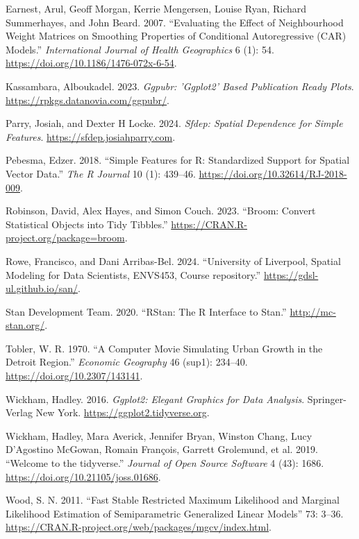 \begin{CSLReferences}{1}{0}
\leavevmode{}%
Earnest, Arul, Geoff Morgan, Kerrie Mengersen, Louise Ryan, Richard Summerhayes, and John Beard. 2007. {``Evaluating the Effect of Neighbourhood Weight Matrices on Smoothing Properties of Conditional Autoregressive (CAR) Models.''} \emph{International Journal of Health Geographics} 6 (1): 54. \url{https://doi.org/10.1186/1476-072x-6-54}.

\leavevmode{}%
Kassambara, Alboukadel. 2023. \emph{Ggpubr: 'Ggplot2' Based Publication Ready Plots}. \url{https://rpkgs.datanovia.com/ggpubr/}.

\leavevmode{}%
Parry, Josiah, and Dexter H Locke. 2024. \emph{Sfdep: Spatial Dependence for Simple Features}. \url{https://sfdep.josiahparry.com}.

\leavevmode{}%
Pebesma, Edzer. 2018. {``{Simple Features for R: Standardized Support for Spatial Vector Data}.''} \emph{{The R Journal}} 10 (1): 439--46. \url{https://doi.org/10.32614/RJ-2018-009}.

\leavevmode{}%
Robinson, David, Alex Hayes, and Simon Couch. 2023. {``Broom: Convert Statistical Objects into Tidy Tibbles.''} \url{https://CRAN.R-project.org/package=broom}.

\leavevmode{}%
Rowe, Francisco, and Dani Arribas-Bel. 2024. {``{University of Liverpool, Spatial Modeling for Data Scientists, ENVS453, Course repository}.''} \url{https://gdsl-ul.github.io/san/}.

\leavevmode{}%
Stan Development Team. 2020. {``{RStan}: The {R} Interface to {Stan}.''} \url{http://mc-stan.org/}.

\leavevmode{}%
Tobler, W. R. 1970. {``A Computer Movie Simulating Urban Growth in the Detroit Region.''} \emph{Economic Geography} 46 (sup1): 234--40. \url{https://doi.org/10.2307/143141}.

\leavevmode{}%
Wickham, Hadley. 2016. \emph{Ggplot2: Elegant Graphics for Data Analysis}. Springer-Verlag New York. \url{https://ggplot2.tidyverse.org}.

\leavevmode{}%
Wickham, Hadley, Mara Averick, Jennifer Bryan, Winston Chang, Lucy D'Agostino McGowan, Romain François, Garrett Grolemund, et al. 2019. {``Welcome to the {tidyverse}.''} \emph{Journal of Open Source Software} 4 (43): 1686. \url{https://doi.org/10.21105/joss.01686}.

\leavevmode{}%
Wood, S. N. 2011. {``Fast Stable Restricted Maximum Likelihood and Marginal Likelihood Estimation of Semiparametric Generalized Linear Models''} 73: 3--36. \url{https://CRAN.R-project.org/web/packages/mgcv/index.html}.

\end{CSLReferences}

